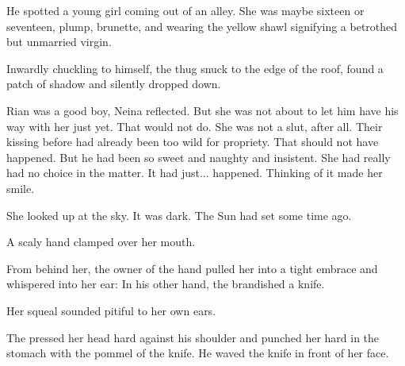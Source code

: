 
He spotted a young \human{} girl coming out of an alley. 
She was maybe sixteen or seventeen, plump, brunette, and wearing the yellow shawl signifying a betrothed but unmarried virgin. 


Inwardly chuckling to himself, the thug snuck to the edge of the roof, found a patch of shadow and silently dropped down. 








\begin{comment}
\section{Neina captured}
\end{comment}
\new
Rian was a good boy, Neina reflected. 
But she was not about to let him have his way with her just yet. 
That would not do. 
She was not a slut, after all. 
Their kissing before had already been too wild for propriety. 
That should not have happened. 
But he had been so sweet and naughty and insistent. 
She had really had no choice in the matter. 
It had just... happened. 
Thinking of it made her smile. 


She looked up at the sky. 
It was dark. 
The Sun had set some time ago. 



A scaly hand clamped over her mouth. 


From behind her, the owner of the hand pulled her into a tight embrace and whispered into her ear: 
In his other hand, the \dax{} brandished a knife. 

 Her squeal sounded pitiful to her own ears. 

The \dax{} pressed her head hard against his shoulder and punched her hard in the stomach with the pommel of the knife. 
He waved the knife in front of her face. 

